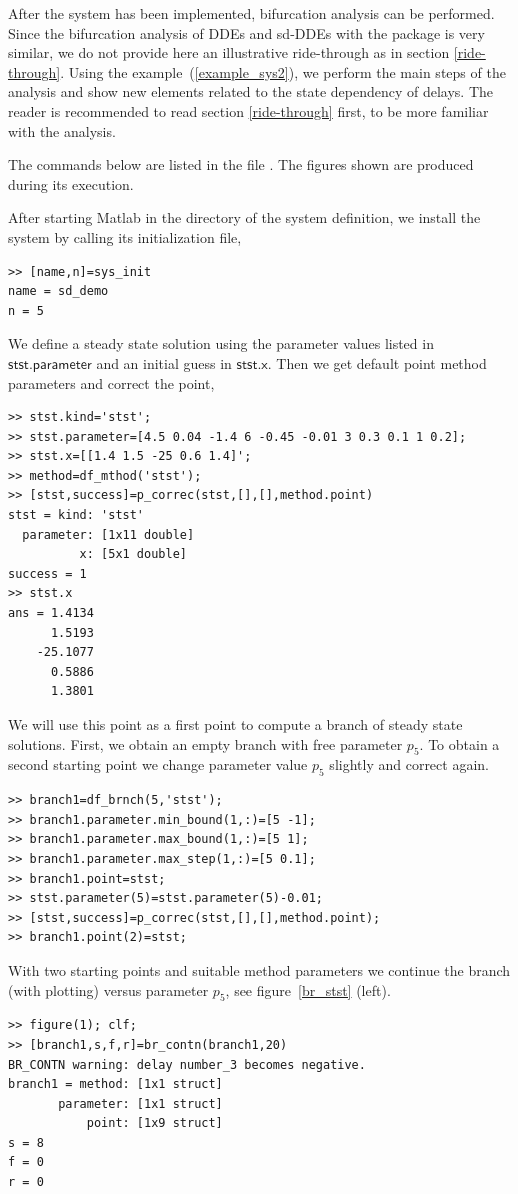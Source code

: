 \documentclass[10pt]{article}
\gdef \file#1{{\bfseries{\ttfamily{#1}}}}
\gdef \parm#1{{\mathsf{#1}}}
\begin{document}
{After the system has been implemented, bifurcation analysis can be performed.
Since the bifurcation analysis of
DDEs and sd-DDEs with the package is very similar, we do not provide
here an illustrative ride-through as in section \ref{ride-through}.
Using the example~(\ref{example_sys2}), we perform the main steps of 
the analysis 
and show new elements related to the state dependency of delays.
The reader is recommended to read section \ref{ride-through} first, 
to be more familiar with the analysis.

The commands below are listed in the file \file{sd\_demo.m}.
The figures shown are produced during its execution. 

After starting Matlab in the directory of the system definition,
we install the system by calling its initialization file,
{\small\begin{verbatim}
>> [name,n]=sys_init
name = sd_demo
n = 5
\end{verbatim}}
We define a steady state solution using the
parameter values listed in $\parm{stst.parameter}$ and an initial
guess in $\parm{stst.x}$. Then we get default point method parameters 
and correct the point,
{\small\begin{verbatim}
>> stst.kind='stst';
>> stst.parameter=[4.5 0.04 -1.4 6 -0.45 -0.01 3 0.3 0.1 1 0.2];
>> stst.x=[[1.4 1.5 -25 0.6 1.4]';
>> method=df_mthod('stst');
>> [stst,success]=p_correc(stst,[],[],method.point)
stst = kind: 'stst'
  parameter: [1x11 double]
          x: [5x1 double]
success = 1
>> stst.x
ans = 1.4134
      1.5193
    -25.1077
      0.5886
      1.3801
\end{verbatim}}
We will use this point as a first point to compute a branch
of steady state solutions. 
First, we obtain an empty branch with free parameter $p_5$.
To obtain a second starting point we change parameter value $p_5$ 
slightly and correct again.

{\small\begin{verbatim}
>> branch1=df_brnch(5,'stst');
>> branch1.parameter.min_bound(1,:)=[5 -1];
>> branch1.parameter.max_bound(1,:)=[5 1];
>> branch1.parameter.max_step(1,:)=[5 0.1];    
>> branch1.point=stst;
>> stst.parameter(5)=stst.parameter(5)-0.01;
>> [stst,success]=p_correc(stst,[],[],method.point);
>> branch1.point(2)=stst;
\end{verbatim}}
With two starting points and suitable method parameters
we continue the branch (with plotting) versus parameter $p_5$,
see figure~\ref{br_stst} (left).
{\small\begin{verbatim}
>> figure(1); clf;
>> [branch1,s,f,r]=br_contn(branch1,20)
BR_CONTN warning: delay number_3 becomes negative.
branch1 = method: [1x1 struct]
       parameter: [1x1 struct]
           point: [1x9 struct]
s = 8
f = 0
r = 0
\end{verbatim}}

}
\end{document}
